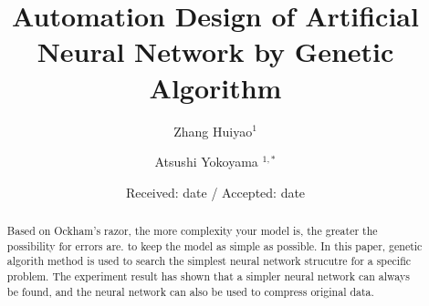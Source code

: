 \documentclass[smallextended]{svjour3}       %
\begin{document}
\title{Automation Design of Artificial Neural Network by Genetic Algorithm}
\author{Zhang Huiyao$^1$  \and
	Atsushi Yokoyama $^{1,*}$
}
\date{Received: date / Accepted: date}
\maketitle

\begin{abstract}
	Based on Ockham's razor, the more complexity your model is, the greater the
	possibility for errors are. to keep the model as simple as possible. In this
	paper, genetic algorith method is used to search the simplest neural network
	strucutre for a specific problem. The experiment result has shown that a
	simpler neural network can always be found, and the neural network can also
	be used to compress original data.
\end{abstract}
\end{document}
